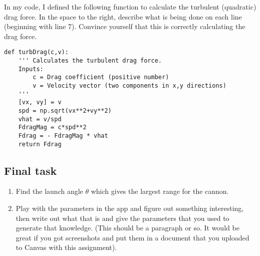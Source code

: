 \documentclass[12pt,hidelinks]{article}
\begin{document}
In my code, I defined the following function to calculate the turbulent (quadratic) drag
force. In the space to the right, describe what is being done on each line (beginning with line
7). Convince yourself that this is correctly calculating the drag force.
\begin{verbatim}
def turbDrag(c,v):
    ''' Calculates the turbulent drag force.
    Inputs:
        c = Drag coefficient (positive number)
        v = Velocity vector (two components in x,y directions)
    '''
    [vx, vy] = v
    spd = np.sqrt(vx**2+vy**2)
    vhat = v/spd
    FdragMag = c*spd**2
    Fdrag = - FdragMag * vhat
    return Fdrag
\end{verbatim}

\subsection{Final task}
\begin{enumerate}
  \item Find the launch angle $\theta$ which gives the largest range for the cannon.
  \item Play with the parameters in the app and figure out something interesting, then write
  out what that is and give the parameters that you used to generate that knowledge. (This
  should be a paragraph or so. It would be great if you got screenshots and put them in a
  document that you uploaded to Canvas with this assignment).
\end{enumerate}
\end{document}
